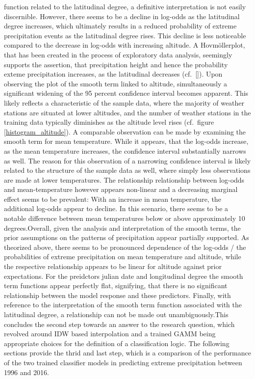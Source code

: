 \documentclass[
  12pt,
]{article}
\begin{document}
function related to the latitudinal degree, a definitive interpretation
is not easily discernible. However, there seems to be a decline in
log-odds as the latitudinal degree increases, which ultimately results
in a reduced probability of extreme precipitation events as the
latitudinal degree rises. This decline is less noticeable compared to
the decrease in log-odds with increasing altitude. A Hovmöllerplot, that
has been created in the process of exploratory data analysis, seemingly
supports the assertion, that precipitation height and hence the
probability exteme precipitation increases, as the latitudinal decreases
(cf.~\ref{}). Upon observing the plot of the smooth term linked to
altitude, simultaneously a significant widening of the 95 percent
confidence interval becomes apparent. This likely reflects a
characteristic of the sample data, where the majority of weather
stations are situated at lower altitudes, and the number of weather
stations in the training data typically diminishes as the altitude level
rises (cf.~figure \ref{histogram_altitude}). A comparable observation
can be made by examining the smooth term for mean temperature. While it
appears, that the log-odds increase, as the mean temperature increases,
the confidence interval substantially narrows as well. The reason for
this observation of a narrowing confidence interval is likely related to
the structure of the sample data as well, where simply less observations
are made at lower temperatures. The relationship relationship between
log-odds and mean-temperature however appears non-linear and a
decreasing marginal effect seems to be prevalent: With an increase in
mean temperature, the additional log-odds appear to decline. In this
scenario, there seems to be a notable difference between mean
temperatures below or above approximately 10 degrees.\newline Overall,
given the analysis and interpretation of the smooth terms, the prior
assumptions on the patterns of precipitation appear partially supported.
As theorized above, there seems to be pronounced dependence of the
log-odds / the probabilities of extreme precipitation on mean
temperature and altitude, while the respective relationship appears to
be linear for altitude against prior expectations. For the preidctors
julian date and longitudinal degree the smooth term functions appear
perfectly flat, signifying, that there is no significant relationship
between the model response and these predictors. Finally, with reference
to the interpretation of the smooth term function associated with the
latitudinal degree, a relationship can not be made out
unambiguously.\newline This concludes the second step towards an answer
to the research question, which revolved around IDW based interpolation
and a trained GAMM being appropriate choices for the definition of a
classification logic. The following sections provide the thrid and last
step, which is a comparison of the performance of the two trained
classifier models in predicting extreme precipitation between 1996 and
2016.
\end{document}
